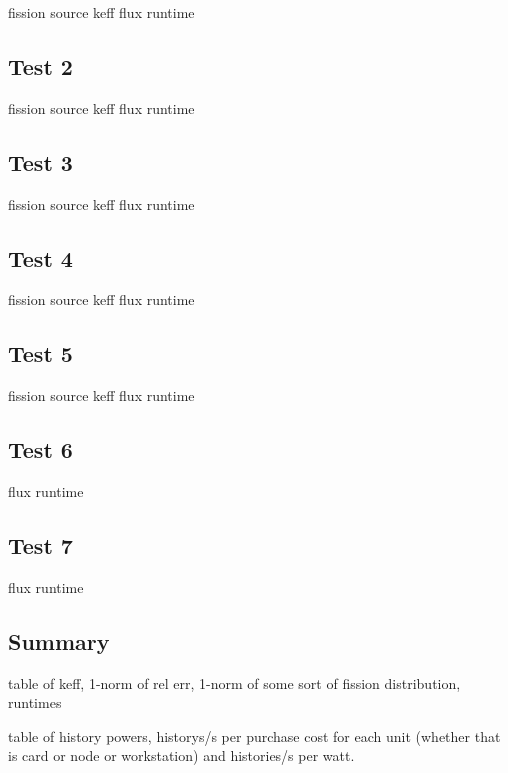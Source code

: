 \documentclass[preprint,12pt]{elsarticle}
\begin{document}
fission source
keff
flux
runtime

\subsection{Test 2}

fission source
keff
flux
runtime

\subsection{Test 3}

fission source
keff
flux
runtime

\subsection{Test 4}

fission source
keff
flux
runtime

\subsection{Test 5}

fission source
keff
flux
runtime

\subsection{Test 6}

flux
runtime

\subsection{Test 7}

flux
runtime

\subsection{Summary}

table of keff, 1-norm of rel err, 1-norm of some sort of fission distribution, runtimes

table of history powers, historys/s per purchase cost for each unit (whether that is card or node or workstation) and histories/s per watt. 
\end{document}
